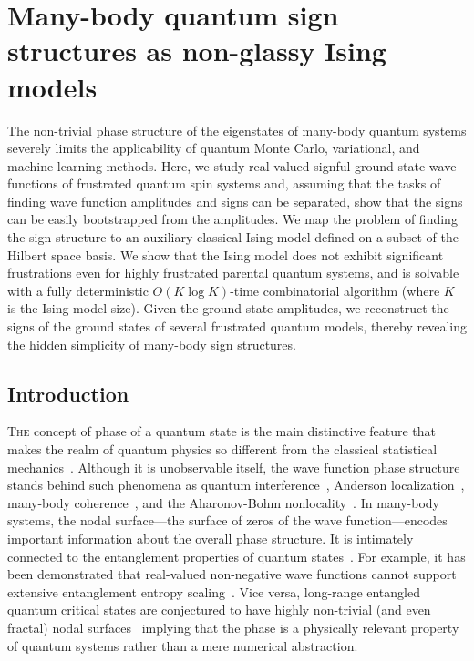 \cleartoverso
\thispagestyle{empty}%
\BgThisPage
\clearpage
\chapter[Many-body quantum sign structures as non-glassy Ising \ \ \ models][Many-body quantum sign structures as non-glassy Ising models]{Many-body quantum sign structures as non-glassy Ising models}\label{ch:cp23}
\BgThisPage

{\small The non-trivial phase structure of the eigenstates of many-body quantum systems severely limits the applicability of quantum Monte Carlo, variational, and machine learning methods. Here, we study real-valued signful ground-state wave functions of frustrated quantum spin systems and, assuming that the tasks of finding wave function amplitudes and signs can be separated, show that the signs can be easily bootstrapped from the amplitudes. We map the problem of finding the sign structure to an auxiliary classical Ising model defined on a subset of the Hilbert space basis. We show that the Ising model does not exhibit significant frustrations even for highly frustrated parental quantum systems, and is solvable with a fully deterministic $O(K\log K)$-time combinatorial algorithm (where $K$ is the Ising model size). Given the ground state amplitudes, we reconstruct the signs of the ground states of several frustrated quantum models, thereby revealing the hidden simplicity of many-body sign structures.}

\clearpage

\section{Introduction}

\lettrine[lines=3]{T}{he} concept of phase of a quantum state is the main distinctive feature that makes the realm of quantum physics so different from the classical statistical mechanics~\cite{quantum_phase}. Although it is unobservable itself, the wave function phase structure stands behind such phenomena as quantum interference~\cite{interference}, Anderson localization~\cite{localization}, many-body coherence~\cite{coherence}, and the Aharonov-Bohm nonlocality~\cite{Aharonov-Bohm,olariu}. In many-body systems, the nodal surface---the surface of zeros of the wave function---encodes important information about the overall phase structure. It is intimately connected to the entanglement properties of quantum states~\cite{Kaplis}. For example, it has been demonstrated that real-valued non-negative wave functions cannot support extensive entanglement entropy scaling~\cite{Grover}. Vice versa, long-range entangled quantum critical states are conjectured to have highly non-trivial (and even fractal) nodal surfaces~\cite{fractals} implying that the phase is a physically relevant property of quantum systems rather than a mere numerical abstraction.

